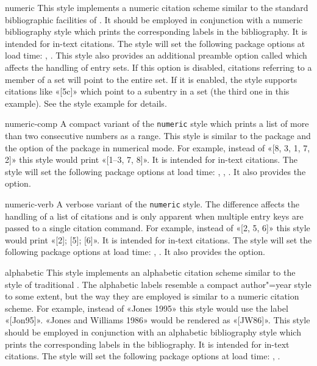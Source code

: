 \documentclass{ltxdockit}[2011/03/25]
\begin{document}
\begin{marglist}

\item[numeric]
This style implements a numeric citation scheme similar to the standard bibliographic facilities of \latex. It should be employed in conjunction with a numeric bibliography style which prints the corresponding labels in the bibliography. It is intended for in-text citations. The style will set the following package options at load time: , . This style also provides an additional preamble option called  which affects the handling of entry sets. If this option is disabled, citations referring to a member of a set will point to the entire set. If it is enabled, the style supports citations like «[5c]» which point to a subentry in a set (the third one in this example). See the style example for details.

\item[numeric-comp]
A compact variant of the \texttt{numeric} style which prints a list of more than two consecutive numbers as a range. This style is similar to the  package and the  option of the  package in numerical mode. For example, instead of «[8, 3, 1, 7, 2]» this style would print «[1--3, 7, 8]». It is intended for in-text citations. The style will set the following package options at load time: , , . It also provides the  option.

\item[numeric-verb]
A verbose variant of the \texttt{numeric} style. The difference affects the handling of a list of citations and is only apparent when multiple entry keys are passed to a single citation command. For example, instead of «[2, 5, 6]» this style would print «[2]; [5]; [6]». It is intended for in-text citations. The style will set the following package options at load time: , . It also provides the  option.

\item[alphabetic]
This style implements an alphabetic citation scheme similar to the  style of traditional \bibtex. The alphabetic labels resemble a compact author"=year style to some extent, but the way they are employed is similar to a numeric citation scheme. For example, instead of «Jones 1995» this style would use the label «[Jon95]». «Jones and Williams 1986» would be rendered as «[JW86]». This style should be employed in conjunction with an alphabetic bibliography style which prints the corresponding labels in the bibliography. It is intended for in-text citations. The style will set the following package options at load time: , .


\end{marglist}
\end{document}
